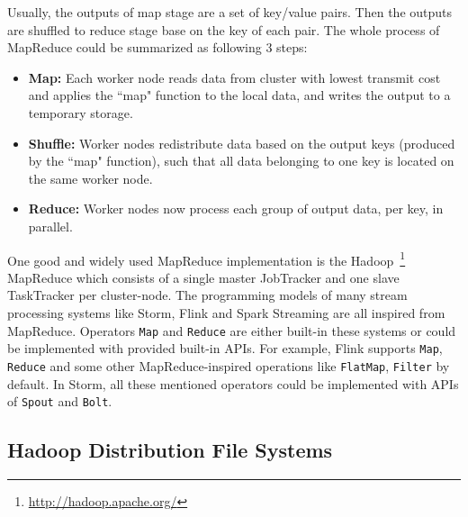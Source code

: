 Usually, the outputs of map stage are a set of key/value pairs. Then the outputs are shuffled to reduce stage base on the key of each pair. The whole process of MapReduce could be summarized as following 3 steps:
\begin{itemize}
  \item \textbf{Map:} Each worker node reads data from cluster with lowest transmit cost and applies the ``map" function to the local data, and writes the output to a temporary storage. 
  \item \textbf{Shuffle:} Worker nodes redistribute data based on the output keys (produced by the ``map" function), such that all data belonging to one key is located on the same worker node.
  \item \textbf{Reduce:} Worker nodes now process each group of output data, per key, in parallel.
\end{itemize}

One good and widely used MapReduce implementation is the Hadoop~\footnote{\url{http://hadoop.apache.org/}} MapReduce \cite{MapReduce} which consists of a single master JobTracker and one slave TaskTracker per cluster-node. The programming models of many stream processing systems like Storm, Flink and Spark Streaming are all inspired from MapReduce. Operators \texttt{Map} and \texttt{Reduce} are either built-in these systems or could be implemented with provided built-in APIs. For example, Flink supports \texttt{Map}, \texttt{Reduce} and some other MapReduce-inspired operations like \texttt{FlatMap}, \texttt{Filter} by default. In Storm, all these mentioned operators could be implemented with APIs of \texttt{Spout} and \texttt{Bolt}.



\subsection{Hadoop Distribution File Systems}
\label{subsection:hdfs}

